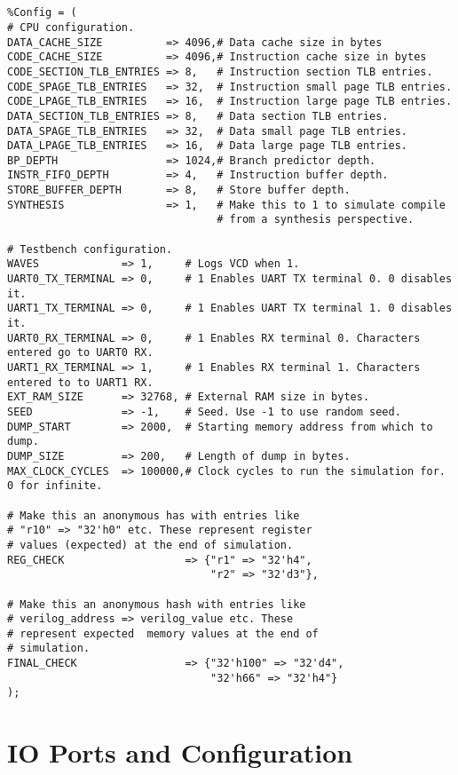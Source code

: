 \documentclass[10pt]{article}
\begin{document}
\\
\begin{lstlisting}[frame=none] % Perl code block start.

%Config = ( 
# CPU configuration.
DATA_CACHE_SIZE          => 4096,# Data cache size in bytes
CODE_CACHE_SIZE          => 4096,# Instruction cache size in bytes
CODE_SECTION_TLB_ENTRIES => 8,   # Instruction section TLB entries.
CODE_SPAGE_TLB_ENTRIES   => 32,  # Instruction small page TLB entries.
CODE_LPAGE_TLB_ENTRIES   => 16,  # Instruction large page TLB entries.
DATA_SECTION_TLB_ENTRIES => 8,   # Data section TLB entries.
DATA_SPAGE_TLB_ENTRIES   => 32,  # Data small page TLB entries.
DATA_LPAGE_TLB_ENTRIES   => 16,  # Data large page TLB entries.
BP_DEPTH                 => 1024,# Branch predictor depth.
INSTR_FIFO_DEPTH         => 4,   # Instruction buffer depth.
STORE_BUFFER_DEPTH       => 8,   # Store buffer depth.
SYNTHESIS                => 1,   # Make this to 1 to simulate compile 
                                 # from a synthesis perspective.

# Testbench configuration.
WAVES             => 1,     # Logs VCD when 1.
UART0_TX_TERMINAL => 0,     # 1 Enables UART TX terminal 0. 0 disables it.
UART1_TX_TERMINAL => 0,     # 1 Enables UART TX terminal 1. 0 disables it.
UART0_RX_TERMINAL => 0,     # 1 Enables RX terminal 0. Characters entered go to UART0 RX.
UART1_RX_TERMINAL => 1,     # 1 Enables RX terminal 1. Characters entered to to UART1 RX. 
EXT_RAM_SIZE      => 32768, # External RAM size in bytes.
SEED              => -1,    # Seed. Use -1 to use random seed.
DUMP_START        => 2000,  # Starting memory address from which to dump.
DUMP_SIZE         => 200,   # Length of dump in bytes.
MAX_CLOCK_CYCLES  => 100000,# Clock cycles to run the simulation for. 0 for infinite.

# Make this an anonymous has with entries like 
# "r10" => "32'h0" etc. These represent register 
# values (expected) at the end of simulation.
REG_CHECK                   => {"r1" => "32'h4", 
                                "r2" => "32'd3"},      

# Make this an anonymous hash with entries like 
# verilog_address => verilog_value etc. These 
# represent expected  memory values at the end of 
# simulation.
FINAL_CHECK                 => {"32'h100" => "32'd4", 
                                "32'h66" => "32'h4"}       
);

\end{lstlisting}

\section{IO Ports and Configuration}
\end{document}
